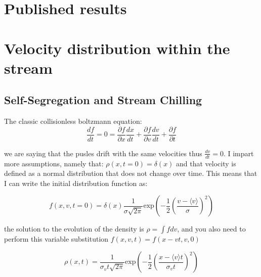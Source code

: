 \section{Published results}

\section{Velocity distribution within the stream}

    \subsection{Self-Segregation and Stream Chilling}

    The classic collisionless boltzmann equation:
    \begin{equation}
        \frac{df}{dt} = 0 = \frac{\partial f}{\partial x} \frac{dx}{dt} + \frac{\partial f}{\partial v} \frac{dv}{dt}+ \frac{\partial f}{\partial t} 
    \end{equation}

    we are saying that the pusles drift with the same velocities thus $\frac{dv}{dt}=0$. I impart more assumptions, namely that: $\rho(x,t=0)=\delta(x)$ and that velocity is defined as a normal distribution that does not change over time. This means that I can write the initial distribution function as:
    
    \begin{equation}
        f(x,v,t=0) = \delta(x)\frac{1}{\sigma\sqrt{2\pi}}\textrm{exp}\left(-\frac{1}{2}\left(\frac{v-\langle v \rangle}{\sigma}\right)^2\right)
    \end{equation}    

    the solution to the evolution of the density is $\rho = \int f dv$, and you also need to perform this variable substitution $f(x,v,t) = f(x-vt,v,0)$

    \begin{equation}
        \rho(x,t) = \frac{1}{\sigma_v t \sqrt{2\pi} }\textrm{exp}\left(-\frac{1}{2}\left(\frac{x-\langle v \rangle t}{\sigma_v t}\right)^2\right)
    \end{equation}
    